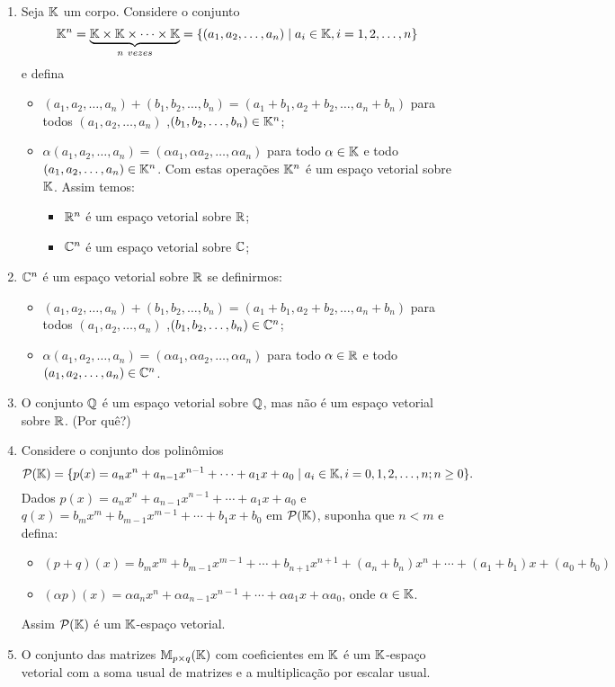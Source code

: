 \begin{exemplo}
\begin{enumerate}[label={\arabic*})]
		\item Seja $\mathbb{K}$ um corpo. Considere o conjunto
		\[
			\mathbb{K}^n = \underbrace{\mathbb{K} \times \mathbb{K} \times \cdots \times \mathbb{K}}_{n\ vezes} = \{(a_1, a_2,\dots,a_n) \mid a_i \in \mathbb{K}, i =1, 2, \dots, n\}
		\]
		e defina
		\begin{itemize}
			\item $(a_1, a_2, \dots, a_n) + (b_1, b_2, \dots,b_n) = (a_1 + b_1, a_2 + b_2,\dots, a_n + b_n)$ para todos $(a_1, a_2, \dots,a_n)$ ,$(b_1, b_2, \dots,b_n) \in \mathbb{K}^n$;
			\item $\alpha (a_1, a_2, \dots,a_n) = (\alpha a_1, \alpha a_2, \dots, \alpha a_n)$ para todo $\alpha \in \mathbb{K}$ e todo $(a_1, a_2, \dots, a_n) \in \mathbb{K}^n$.
			Com estas opera\c{c}\~oes $\mathbb{K}^n$ \'e um espa\c{c}o vetorial sobre $\mathbb{K}$. Assim temos:
			\begin{itemize}
				\item $\mathbb{R}^n$ \'e um espa\c{c}o vetorial sobre $\mathbb{R}$;
				\item $\mathbb{C}^n$ \'e um espa\c{c}o vetorial sobre $\mathbb{C}$;
			\end{itemize}
		\end{itemize}
		\item $\mathbb{C}^n$ \'e um espa\c{c}o vetorial sobre $\mathbb{R}$ se definirmos:
		\begin{itemize}
			\item $(a_1, a_2, \dots, a_n) + (b_1, b_2, \dots,b_n) = (a_1 + b_1, a_2 + b_2,\dots, a_n + b_n)$ para todos $(a_1, a_2, \dots,a_n)$ ,$(b_1, b_2, \dots,b_n) \in \mathbb{C}^n$;
			\item $\alpha (a_1, a_2, \dots,a_n) = (\alpha a_1, \alpha a_2, \dots, \alpha a_n)$ para todo $\alpha \in \mathbb{R}$ e todo $(a_1, a_2, \dots, a_n) \in \mathbb{C}^n$.
		\end{itemize}
		\item O conjunto $\mathbb{Q}$ \'e um espa\c{c}o vetorial sobre $\mathbb{Q}$, mas n\~ao \'e um espa\c{c}o vetorial sobre $\mathbb{R}$. (Por qu\^e?)
		\item Considere o conjunto dos polin\^omios
		\[
			\mathcal{P}(\mathbb{K}) = \{ p(x) = a_nx^n + a_{n - 1}x^{n - 1} + \cdots + a_1x + a_0 \mid a_i \in \mathbb{K}, i = 0, 1, 2, \dots, n; n \ge 0 \}.
		\]
		Dados $p(x) = a_nx^n + a_{n - 1}x^{n - 1} + \cdots + a_1x + a_0$ e $q(x) = b_mx^m + b_{m - 1}x^{m - 1} + \cdots + b_1x + b_0$ em $\mathcal{P}(\mathbb{K})$, suponha que $n < m$ e defina:
		\begin{itemize}
			\item $(p + q)(x) = b_mx^m + b_{m - 1}x^{m - 1} + \cdots + b_{n + 1}x^{n + 1} + (a_n + b_n)x^n + \cdots + (a_1 + b_1)x + (a_0 + b_0)$
			\item $(\alpha p)(x) = \alpha a_nx^n + \alpha a_{n - 1}x^{n - 1} + \cdots + \alpha a_1x + \alpha a_0$, onde $\alpha \in \mathbb{K}$.
		\end{itemize}
		Assim $\mathcal{P}(\mathbb{K})$ \'e um $\mathbb{K}$-espa\c{c}o vetorial.
		\item O conjunto das matrizes $\mathbb{M}_{p \times q}(\mathbb{K})$ com coeficientes em $\mathbb{K}$ \'e um $\mathbb{K}$-espa\c{c}o vetorial com a soma usual de matrizes e a multiplica\c{c}\~ao por escalar usual.


\end{enumerate}
\end{exemplo}
